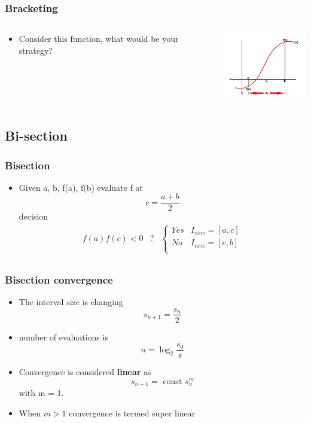 \documentclass[10pt]{beamer}
\begin{document}
\begin{frame}
  \frametitle{Bracketing}
  \begin{columns}
    \begin{column}{4.8cm}
      \begin{itemize}
      \item Consider this function, what would be your strategy? 
      \end{itemize}
    \end{column}
    \begin{column}{4.5cm}
      \centerline{\includegraphics[width=4cm]{example-function}}
    \end{column}
  \end{columns}
\end{frame}

\subsection{Bi-section}

\begin{frame}
  \frametitle{Bisection}
  \begin{itemize}
  \item Given a, b, f(a), f(b) evaluate f at
    \[
      c = \frac{a+b}{2}
    \]
    decision
    \[
      \begin{array}{ccc}
        f(a) f(c) < 0 &?& \left\{
                          \begin{array}{cc}
                            Yes & I_{new} = [a,c]\\
                            No & I_{new} = [c,b]\\
                          \end{array}\right. \\

      \end{array}
    \]
  \end{itemize}
\end{frame}

\begin{frame}
  \frametitle{Bisection convergence}
  \begin{itemize}
  \item The interval size is changing
    \[
      s_{n+1} = \frac{s_n}{2}
    \]
  \item number of evaluations is
    \[
      n = \log_2 \frac{s_0}{s}
    \]
  \item Convergence is considered {\bf linear} as
    \[
      s_{n+1} = \mbox{ const } s_n^m
    \] with m = 1. 
  \item When $m>1$ convergence is termed super linear
  \end{itemize}
\end{frame}
\end{document}
